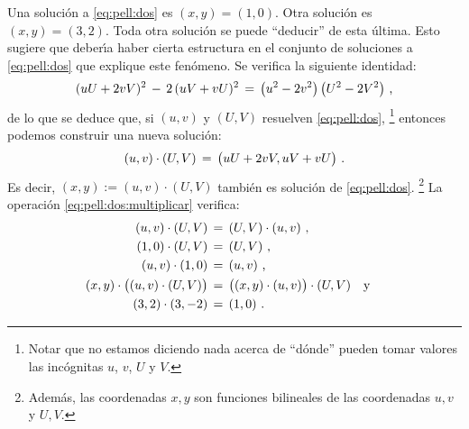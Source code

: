 Una soluci\'on a \eqref{eq:pell:dos} es $(x,y)=(1,0)$.
Otra soluci\'on es $(x,y)=(3,2)$.
Toda otra soluci\'on se puede ``deducir'' de esta \'ultima.
Esto sugiere que deber\'{\i}a haber cierta estructura en el conjunto
de soluciones a \eqref{eq:pell:dos} que explique este fen\'omeno.
Se verifica la siguiente identidad:
\begin{equation}
	\label{eq:pell:dos:identidad}
	(uU+2vV)^2\,-\,2\,(uV+vU)^2\,=\,
		\big(u^2-2v^2\big)\,\big(U^2-2V^2\big)
	\text{ ,}
\end{equation}
%
de lo que se deduce que,
si $(u,v)$ y $(U,V)$ resuelven \eqref{eq:pell:dos},%
\footnote{
	Notar que no estamos diciendo nada acerca de ``d\'onde''
	pueden tomar valores las inc\'ognitas $u$, $v$, $U$ y $V$.
}
entonces podemos construir una nueva soluci\'on:
\begin{equation}
	\label{eq:pell:dos:multiplicar}
	(u,v)\cdot (U,V)\,=\,\big(uU+2vV,uV+vU\big)
	\text{ .}
\end{equation}
%
Es decir, $(x,y):=(u,v)\cdot (U,V)$ tambi\'en es soluci\'on
de \eqref{eq:pell:dos}.%
\footnote{
	Adem\'as, las coordenadas $x,y$ son funciones bilineales
	de las coordenadas $u,v$ y $U,V$.
}
La operaci\'on \eqref{eq:pell:dos:multiplicar} verifica:
\begin{displaymath}
	\begin{aligned}
		(u,v)\cdot (U,V) & \,=\,(U,V)\cdot (u,v)\text{ ,} \\
		(1,0)\cdot (U,V) & \,=\,(U,V)\text{ ,} \\
		(u,v)\cdot (1,0) & \,=\,(u,v)\text{ ,} \\
		(x,y)\cdot\big((u,v)\cdot (U,V)\big) & \,=\,
			\big((x,y)\cdot (u,v)\big)\cdot (U,V)\quad\text{y}\quad \\
		(3,2)\cdot (3,-2) & \,=\,(1,0)\text{ .}
	\end{aligned}
\end{displaymath}
%

